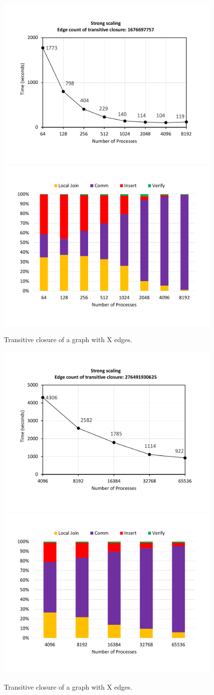 \begin{figure}[t]
	{\includegraphics[width=.50\textwidth,  trim={0cm 0cm 0cm 0cm, 
			clip}]{results/TC_1_final.pdf}}\hfill%
	{\includegraphics[width=.50\textwidth,  trim={0cm 0cm 0cm 0cm,
			clip}]{results/TC_1_break_down_final.pdf}}\hfill%
	\centering
	\caption{Transitive closure of a graph with X edges.}
	\label{fig:tc_small}
\end{figure}

\begin{figure}[t]
	{\includegraphics[width=.50\textwidth,  trim={0cm 0cm 0cm 0cm, 
			clip}]{results/TC_2_final.pdf}}\hfill%
	{\includegraphics[width=.50\textwidth,  trim={0cm 0cm 0cm 0cm,
			clip}]{results/TC_2_break_down_final.pdf}}\hfill%
	\centering
	\caption{Transitive closure of a graph with X edges.}
	\label{fig:tc_big}
\end{figure}


